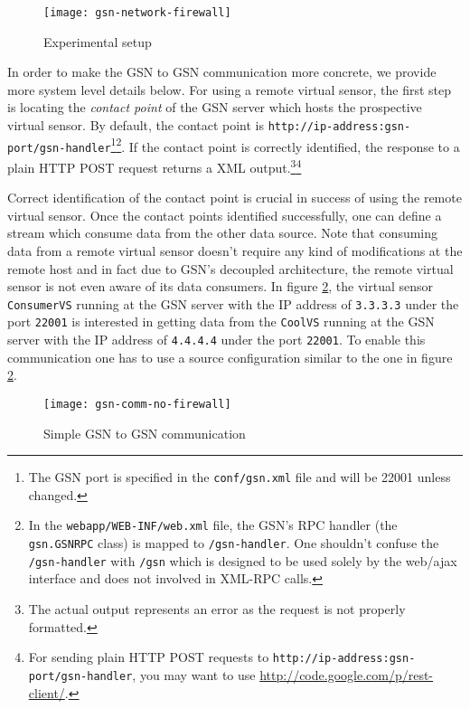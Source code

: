 \begin{figure}%
  \centering
  \texttt{[image: gsn-network-firewall]}
  \caption{Experimental setup}
  \label{fig:gsn-network-firewall}
\end{figure}

In order to make the GSN to GSN communication more concrete, we provide more system level details below.
For using a remote virtual sensor, the first step is locating the \emph{contact point} of the GSN server which
hosts the prospective virtual sensor. By default, the contact point is \texttt{http://ip-address:gsn-port/gsn-handler}\footnote{The GSN port is specified in the \texttt{conf/gsn.xml} file and will be 22001 unless changed.}\footnote{In the \texttt{webapp/WEB-INF/web.xml} file, the GSN's RPC handler (the \texttt{gsn.GSNRPC} class) is mapped to \texttt{/gsn-handler}. One shouldn't confuse the \texttt{/gsn-handler} with \texttt{/gsn} which is designed to be used solely by the web/ajax interface and does not involved in XML-RPC calls.}.
If  the contact point is correctly identified, the response to a plain HTTP POST request 
returns a XML output.\footnote{The actual output represents an error as the request is not properly formatted.}\footnote{For sending plain HTTP POST requests
to \texttt{http://ip-address:gsn-port/gsn-handler}, you may want to use \url{http://code.google.com/p/rest-client/}. }

Correct identification of the contact point is crucial in success of using the remote virtual sensor.
Once the contact points identified successfully, one can define a stream which consume data from the other data source.
Note that consuming data from a remote virtual sensor doesn't require any kind of modifications at the remote host and in fact 
due to GSN's decoupled architecture, the remote virtual sensor is not even aware of its data consumers. In figure \ref{gsn2gsn-simple-figure},
the virtual sensor \texttt{ConsumerVS} running at the GSN server with the IP address of \texttt{3.3.3.3} under the port \texttt{22001} is interested
in getting data from the \texttt{CoolVS} running at the GSN server with the IP address of \texttt{4.4.4.4} under the port \texttt{22001}. To enable this
communication one has to use a source configuration similar to the one in figure \ref{gsn2gsn-simple-figure}.


\begin{figure}%
  \centering
  \texttt{[image: gsn-comm-no-firewall]}
  \caption{Simple GSN to GSN communication}
  \label{gsn2gsn-simple-figure}
\end{figure}


